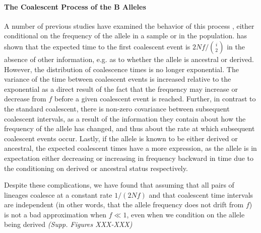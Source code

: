 \documentclass[a4paper,10pt]{article}
\newcommand{\jb}[1]{{\it\color{blue} (#1)} }
\begin{document}
\paragraph{The Coalescent Process of the B Alleles}


A number of previous studies have examined the behavior of this process \citep{Wiuf1999,Wiuf:2000js,Patterson2005}, either conditional on the frequency of the allele in a sample or in the population. \cite{Wiuf:2000js} has shown that the expected time to the first coalescent event is $2 N f/ {i \choose 2}$ in the absence of other information, e.g. as to whether the allele is ancestral or derived. However, the distribution of coalescence times is no longer exponential. The variance of the time between coalescent events is increased relative to the exponential as a direct result of the fact that the frequency may increase or decrease from $f$ before a given coalescent event is reached. Further, in contrast to the standard coalescent, there is non-zero covariance between subsequent coalescent intervals, as a result of the information they contain about how the frequency of the allele has changed, and thus about the rate at which subsequent coalescent events occur. Lastly, if the allele is known to be either derived or ancestral, the expected coalescent times have a more expression, as the allele is in expectation either decreasing or increasing in frequency backward in time due to the conditioning on derived or ancestral status respectively.

Despite these complications, we have found that assuming that all pairs of lineages coalesce at a constant rate $1/(2 N f)$ and that coalescent time intervals are independent (in other words, that the allele frequency does not drift from $f$) is not a bad approximation when $f \ll 1$, even when we condition on the allele being derived \jb{Supp. Figures XXX-XXX}
\end{document}
